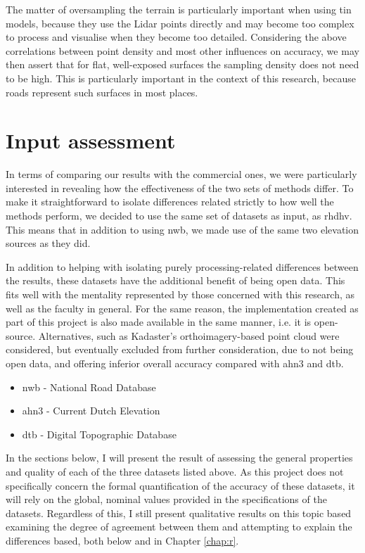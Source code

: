 The matter of oversampling the terrain is particularly important when using \ac{tin} models, because they use the Lidar points directly and may become too complex to process and visualise when they become too detailed. Considering the above correlations between point density and most other influences on accuracy, we may then assert that for flat, well-exposed surfaces the sampling density does not need to be high. This is particularly important in the context of this research, because roads represent such surfaces in most places.

\section{Input assessment}
\label{sec:input}

In terms of comparing our results with the commercial ones, we were particularly interested in revealing how the effectiveness of the two sets of methods differ. To make it straightforward to isolate differences related strictly to how well the methods perform, we decided to use the same set of datasets as input, as \ac{rhdhv}. This means that in addition to using \ac{nwb}, we made use of the same two elevation sources as they did.

In addition to helping with isolating purely processing-related differences between the results, these datasets have the additional benefit of being open data. This fits well with the mentality represented by those concerned with this research, as well as the faculty in general. For the same reason, the implementation created as part of this project is also made available in the same manner, i.e. it is open-source. Alternatives, such as Kadaster's orthoimagery-based point cloud were considered, but eventually excluded from further consideration, due to not being open data, and offering inferior overall accuracy compared with \ac{ahn3} and \ac{dtb}.

\begin{itemize}
\item \ac{nwb} - National Road Database
\item \ac{ahn3} - Current Dutch Elevation
\item \ac{dtb} - Digital Topographic Database
\end{itemize}

In the sections below, I will present the result of assessing the general properties and quality of each of the three datasets listed above. As this project does not specifically concern the formal quantification of the accuracy of these datasets, it will rely on the global, nominal values provided in the specifications of the datasets. Regardless of this, I still present qualitative results on this topic based examining the degree of agreement between them and attempting to explain the differences based, both below and in Chapter \ref{chap:r}.

